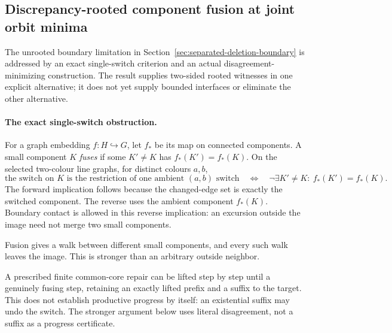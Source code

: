 \subsection{Discrepancy-rooted component fusion at joint orbit minima}
\label{sec:discrepancy-rooted-fusion}

The unrooted boundary limitation in
Section~\ref{sec:separated-deletion-boundary} is addressed by an exact
single-switch criterion and an actual disagreement-minimizing construction.
The result supplies two-sided rooted witnesses in one explicit alternative;
it does not yet supply bounded interfaces or eliminate the other alternative.

\paragraph{The exact single-switch obstruction.}
For a graph embedding $f:H\hookrightarrow G$, let $f_*$ be its map on
connected components. A small component $K$ \emph{fuses} if some
$K'\ne K$ has $f_*(K')=f_*(K)$. On the selected two-colour line graphs,
for distinct colours $a,b$,
\[
 \text{the switch on $K$ is the restriction of one ambient $(a,b)$ switch}
 \quad\Longleftrightarrow\quad
 \neg\exists K'\ne K:\ f_*(K')=f_*(K).
\]
The forward implication follows because the changed-edge set is exactly
the switched component. The reverse uses the ambient component $f_*(K)$.
Boundary contact is allowed in this reverse implication: an excursion
outside the image need not merge two small components.

Fusion gives a walk between different small components, and every such
walk leaves the image. This is stronger than an arbitrary outside neighbor.

A prescribed finite common-core repair can be lifted step by step until
a genuinely fusing step, retaining an exactly lifted prefix and a suffix
to the target. This does not establish productive progress by itself:
an existential suffix may undo the switch. The stronger argument below
uses literal disagreement, not a suffix as a progress certificate.


